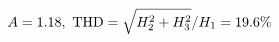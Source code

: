\documentclass[preview]{standalone}
\begin{document}
\begin{align*}
\special{dvisvgm:raw <g id='unique000'>}A=1.18,\ \text{THD}=\sqrt{H_2^2+H_3^2}/H_1=19.6\%\special{dvisvgm:raw </g>}
\end{align*}
\end{document}
